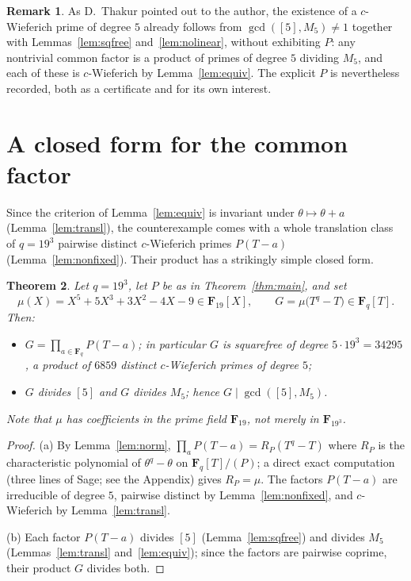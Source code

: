 \documentclass[11pt]{amsart}
\newcommand{\F}{\mathbf{F}}
\theoremstyle{plain}
\newtheorem{theorem}{Theorem}[section]
\theoremstyle{definition}
\newtheorem{remark}[theorem]{Remark}
\begin{document}
\begin{remark}
As D.~Thakur pointed out to the author, the existence of a $c$-Wieferich prime
of degree $5$ already follows from $\gcd([5],M_5)\neq1$ together with
Lemmas~\ref{lem:sqfree} and~\ref{lem:nolinear}, without exhibiting $P$: any
nontrivial common factor is a product of primes of degree $5$ dividing $M_5$,
and each of these is $c$-Wieferich by Lemma~\ref{lem:equiv}. The explicit $P$ is
nevertheless recorded, both as a certificate and for its own interest.
\end{remark}

\section{A closed form for the common factor}

Since the criterion of Lemma~\ref{lem:equiv} is invariant under
$\theta\mapsto\theta+a$ (Lemma~\ref{lem:transl}), the counterexample comes with
a whole translation class of $q=19^3$ pairwise distinct $c$-Wieferich primes
$P(T-a)$ (Lemma~\ref{lem:nonfixed}). Their product has a strikingly simple
closed form.

\begin{theorem}\label{thm:closed}
Let $q=19^3$, let $P$ be as in Theorem~\ref{thm:main}, and set
\[
\mu(X)=X^5+5X^3+3X^2-4X-9\in\F_{19}[X],\qquad G=\mu\bigl(T^q-T\bigr)\in\F_q[T].
\]
Then:
\begin{itemize}
\item[(a)] $G=\prod_{a\in\F_q}P(T-a)$; in particular $G$ is squarefree of
degree $5\cdot19^3=34295$, a product of $6859$ distinct $c$-Wieferich primes of
degree $5$;
\item[(b)] $G$ divides $[5]$ and $G$ divides $M_5$; hence $G\mid\gcd([5],M_5)$.
\end{itemize}
Note that $\mu$ has coefficients in the prime field $\F_{19}$, not merely in
$\F_{19^3}$.
\end{theorem}

\begin{proof}
(a) By Lemma~\ref{lem:norm}, $\prod_a P(T-a)=R_P(T^q-T)$ where $R_P$ is the
characteristic polynomial of $\theta^q-\theta$ on $\F_q[T]/(P)$; a direct exact
computation (three lines of Sage; see the Appendix) gives $R_P=\mu$. The factors
$P(T-a)$ are irreducible of degree $5$, pairwise distinct by
Lemma~\ref{lem:nonfixed}, and $c$-Wieferich by Lemma~\ref{lem:transl}.

(b) Each factor $P(T-a)$ divides $[5]$ (Lemma~\ref{lem:sqfree}) and divides
$M_5$ (Lemmas~\ref{lem:transl} and~\ref{lem:equiv}); since the factors are
pairwise coprime, their product $G$ divides both.
\end{proof}
\end{document}
